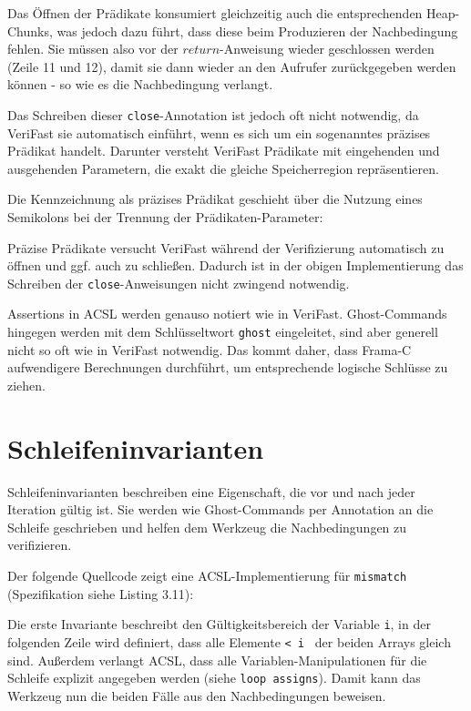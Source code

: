 Das Öffnen der Prädikate konsumiert gleichzeitig auch die entsprechenden Heap-Chunks, was jedoch dazu führt,
dass diese beim Produzieren der Nachbedingung fehlen. Sie müssen also vor der \(return\)-Anweisung
wieder geschlossen werden (Zeile 11 und 12), damit sie dann wieder an den Aufrufer zurückgegeben werden können 
- so wie es die Nachbedingung verlangt.

Das Schreiben dieser \texttt{close}-Annotation ist jedoch oft nicht notwendig, da VeriFast sie automatisch
einführt, wenn es sich um ein sogenanntes präzises Prädikat handelt. Darunter versteht VeriFast Prädikate mit 
eingehenden und ausgehenden Parametern, die exakt die gleiche Speicherregion repräsentieren. 

Die Kennzeichnung als präzises Prädikat geschieht über die Nutzung eines Semikolons bei der Trennung
der Prädikaten-Parameter:



Präzise Prädikate versucht VeriFast während der Verifizierung automatisch zu öffnen und ggf. auch zu
schließen. Dadurch ist in der obigen Implementierung das Schreiben der \texttt{close}-Anweisungen
nicht zwingend notwendig.

Assertions in ACSL werden genauso notiert wie in VeriFast. Ghost-Commands hingegen werden
mit dem Schlüsseltwort \lstinline{ghost} eingeleitet, sind aber generell nicht so oft wie in
VeriFast notwendig. Das kommt daher, dass Frama-C aufwendigere Berechnungen durchführt, um
entsprechende logische Schlüsse zu ziehen. 


\section{Schleifeninvarianten}

Schleifeninvarianten beschreiben eine Eigenschaft, die vor und nach jeder Iteration gültig ist. Sie
werden wie Ghost-Commands per Annotation an die Schleife geschrieben und helfen dem Werkzeug die
Nachbedingungen zu verifizieren.

Der folgende Quellcode zeigt eine ACSL-Implementierung für \lstinline{mismatch}
(Spezifikation siehe Listing 3.11):


Die erste Invariante beschreibt den Gültigkeitsbereich der Variable \lstinline{i}, in der folgenden Zeile wird definiert, 
dass alle Elemente \lstinline{< i } der beiden Arrays gleich sind. Außerdem verlangt ACSL, dass alle
Variablen-Manipulationen für die Schleife explizit angegeben werden (siehe \texttt{loop assigns}). Damit kann das Werkzeug
nun die beiden Fälle aus den Nachbedingungen beweisen.

